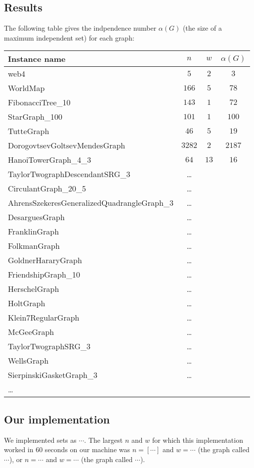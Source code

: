 \documentclass{tufte-handout}
\begin{document}
\subsection{Results}

The following table gives the indpendence number $\alpha(G)$ (the size of a maximum independent set) for each graph:


\medskip
\begin{tabular}{lccc}
  \toprule
  Instance name & $n$ & $w$ & $\alpha(G)$   \\
  \midrule
  web4 & $5$ & $2$ & $3$ \\ 
  WorldMap & $166$ & $5$ & $78$ \\
  FibonacciTree\_10 & $143$ & $1$ & $72$ \\
  StarGraph\_100 & $101$ & $1$ & $100$ \\
  TutteGraph & $46$ & $5$ & $19$ \\
DorogovtsevGoltsevMendesGraph & $3282$ & $2$ & $2187$ \\
HanoiTowerGraph\_4\_3 & $64$ & $13$ & $16$ \\
TaylorTwographDescendantSRG\_3 & \ldots \\
CirculantGraph\_20\_5 & \ldots\\
AhrensSzekeresGeneralizedQuadrangleGraph\_3 & \ldots \\
DesarguesGraph & \ldots\\
  FranklinGraph & \ldots\\
FolkmanGraph & \ldots\\
  GoldnerHararyGraph &\ldots\\
FriendshipGraph\_10 &\ldots\\
  HerschelGraph &\ldots\\
HoltGraph &\ldots\\
  Klein7RegularGraph &\ldots\\ 
McGeeGraph & \ldots\\
TaylorTwographSRG\_3 & \ldots\\
WellsGraph & \ldots\\
  SierpinskiGasketGraph\_3 & \ldots\\

  \ldots\\
  \bottomrule
\end{tabular}


\subsection{Our implementation}

We implemented sets as $\cdots$.
The largest $n$ and $w$ for which this implementation worked  in 60 seconds on our
machine was $n=[\cdots]$ and $w=\cdots$ (the graph called $\cdots$), or $n=\cdots$ and $w=\cdots$ (the graph called $\cdots$).
\end{document}
